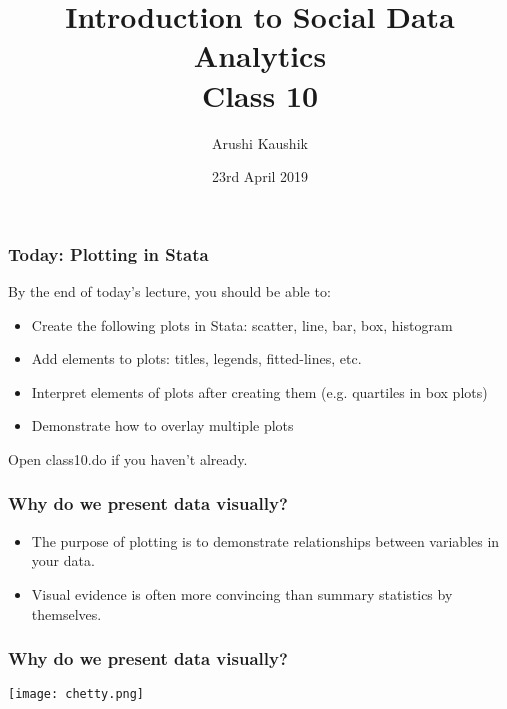 \documentclass[11pt]{beamer}
\title[Class 10]{Introduction to Social Data Analytics \\
	\bigskip Class 10}
\author[Kaushik]{Arushi Kaushik}
\institute[UCSD]{arkaushi@ucsd.edu}
\date{23rd April 2019}
\begin{document}
\frame{\titlepage}


\begin{frame}
\frametitle{Today: Plotting in Stata}
By the end of today's lecture, you should be able to:
\begin{itemize} \itemsep1em
	\item Create the following plots in Stata: scatter, line, bar, box, histogram
	\item Add elements to plots: titles, legends, fitted-lines, etc.
	\item Interpret elements of plots after creating them (e.g. quartiles in box plots)
	\item Demonstrate how to overlay multiple plots
\end{itemize} \bigskip
Open class10.do if you haven't already. 
\end{frame}

\begin{frame}
    \frametitle{Why do we present data visually?}
    \begin{itemize}
        \item The purpose of plotting is to demonstrate relationships between variables in your data. \pause
        \item Visual evidence is often more convincing than summary statistics by themselves.
    \end{itemize}
\end{frame}

\begin{frame}
    \frametitle{Why do we present data visually?}
    \begin{center}
    \texttt{[image: chetty.png]}
    \end{center}
\end{frame}
\end{document}
